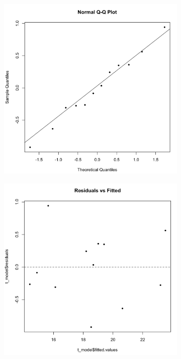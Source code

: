 \documentclass[11pt]{article}
\begin{document}
\begin{figure}[H]
    \centering
    \begin{subfigure}{0.45\textwidth}
        \includegraphics[width=\textwidth]{../pictures/hw3_q1_2_qq.png}
    \end{subfigure}
    \begin{subfigure}{0.45\textwidth}
        \includegraphics[width=\textwidth]{../pictures/hw3_q1_2_nf.png}
    \end{subfigure}
\end{figure}
\end{document}
